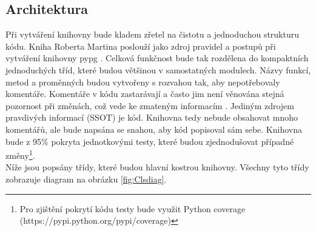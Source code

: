 \documentclass[ing,male,java,dept456]{diploma}						%
\begin{document}
\subsection{Architektura}

Při vytváření knihovny bude kladem zřetel na čistotu a jednoduchou strukturu kódu. Kniha Roberta Martina poslouží jako zdroj pravidel a postupů při vytváření knihovny pypg \cite{cleancode}. Celková funkčnost bude tak rozdělena do kompaktních jednoduchých tříd, které budou většinou v samostatných modulech. Názvy funkcí, metod a proměnných budou vytvořeny s rozvahou tak, aby nepotřebovaly komentáře. Komentáře v kódu zastarávají a často jim není věnována stejná pozornost při změnách, což vede ke zmateným informacím  \cite{cleancode}. Jediným zdrojem pravdivých informací (SSOT) je kód. Knihovna tedy nebude obsahovat mnoho komentářů, ale bude napsána se snahou, aby kód popisoval sám sebe. Knihovna bude z 95\% pokryta jednotkovými testy, které budou zjednodušovat případné změny\footnote{Pro zjištění pokrytí kódu testy bude využit Python coverage (https://pypi.python.org/pypi/coverage)}. \\
Níže jsou popsány třídy, které budou hlavní kostrou knihovny. Všechny tyto třídy zobrazuje diagram na obrázku \ref{fig:Clsdiag}.
\end{document}

